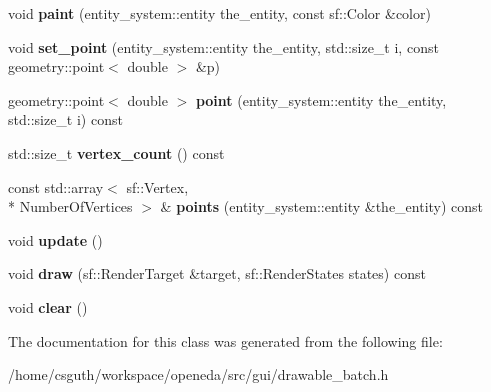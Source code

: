\begin{DoxyCompactItemize}
\item 
\hypertarget{classophidian_1_1gui_1_1drawable__batch_a8fa84b4657c787cd6d7c708721351b94}{void {\bfseries paint} (entity\-\_\-system\-::entity the\-\_\-entity, const sf\-::\-Color \&color)}\label{classophidian_1_1gui_1_1drawable__batch_a8fa84b4657c787cd6d7c708721351b94}

\item 
\hypertarget{classophidian_1_1gui_1_1drawable__batch_a736b81928d5f5653c91759c23bad559c}{void {\bfseries set\-\_\-point} (entity\-\_\-system\-::entity the\-\_\-entity, std\-::size\-\_\-t i, const geometry\-::point$<$ double $>$ \&p)}\label{classophidian_1_1gui_1_1drawable__batch_a736b81928d5f5653c91759c23bad559c}

\item 
\hypertarget{classophidian_1_1gui_1_1drawable__batch_ad0d99d790174a84b2373f1ee84ad4769}{geometry\-::point$<$ double $>$ {\bfseries point} (entity\-\_\-system\-::entity the\-\_\-entity, std\-::size\-\_\-t i) const }\label{classophidian_1_1gui_1_1drawable__batch_ad0d99d790174a84b2373f1ee84ad4769}

\item 
\hypertarget{classophidian_1_1gui_1_1drawable__batch_a0f61cceafa61a41cb69fc048eb7dd740}{std\-::size\-\_\-t {\bfseries vertex\-\_\-count} () const }\label{classophidian_1_1gui_1_1drawable__batch_a0f61cceafa61a41cb69fc048eb7dd740}

\item 
\hypertarget{classophidian_1_1gui_1_1drawable__batch_a8c4ae478758c027894b7ec2c9f8da342}{const std\-::array$<$ sf\-::\-Vertex, \\*
Number\-Of\-Vertices $>$ \& {\bfseries points} (entity\-\_\-system\-::entity \&the\-\_\-entity) const }\label{classophidian_1_1gui_1_1drawable__batch_a8c4ae478758c027894b7ec2c9f8da342}

\item 
\hypertarget{classophidian_1_1gui_1_1drawable__batch_a257bc8e3b09edecf7afc7b12353eff25}{void {\bfseries update} ()}\label{classophidian_1_1gui_1_1drawable__batch_a257bc8e3b09edecf7afc7b12353eff25}

\item 
\hypertarget{classophidian_1_1gui_1_1drawable__batch_a33b349a5476e9f1447dcd917b0f3e5ba}{void {\bfseries draw} (sf\-::\-Render\-Target \&target, sf\-::\-Render\-States states) const }\label{classophidian_1_1gui_1_1drawable__batch_a33b349a5476e9f1447dcd917b0f3e5ba}

\item 
\hypertarget{classophidian_1_1gui_1_1drawable__batch_a09dc2760a7f3737af26c48d878dbae7d}{void {\bfseries clear} ()}\label{classophidian_1_1gui_1_1drawable__batch_a09dc2760a7f3737af26c48d878dbae7d}

\end{DoxyCompactItemize}


The documentation for this class was generated from the following file\-:\begin{DoxyCompactItemize}
\item 
/home/csguth/workspace/openeda/src/gui/drawable\-\_\-batch.\-h\end{DoxyCompactItemize}
